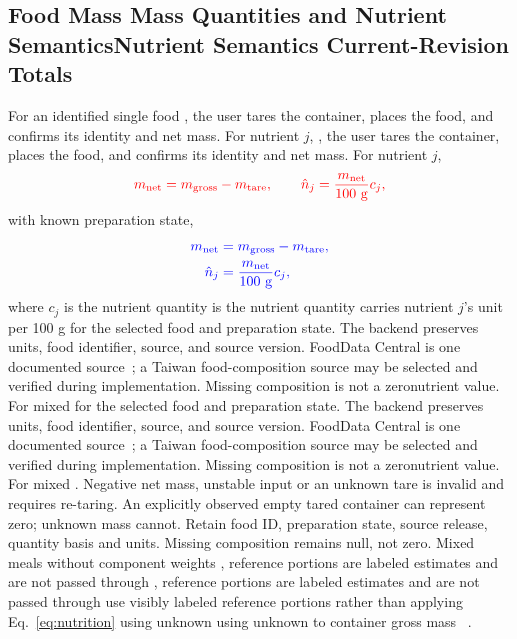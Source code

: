 \documentclass[conference]{IEEEtran}
\providecommand{\DIFadd}[1]{{\protect\color{blue} \sf #1}} %
\providecommand{\DIFdel}[1]{{\protect\color{red} \ifmmode #1\else\scriptsize #1\fi}} %
\providecommand{\DIFaddbegin}{} %
\providecommand{\DIFaddend}{} %
\providecommand{\DIFdelbegin}{} %
\providecommand{\DIFdelend}{} %
\begin{document}
\subsection{Food \DIFdelbegin \DIFdel{Mass }\DIFdelend \DIFaddbegin \DIFadd{Quantities }\DIFaddend and \DIFdelbegin \DIFdel{Nutrient Semantics}\DIFdelend \DIFaddbegin \DIFadd{Current-Revision Totals}\DIFaddend }
For an identified single food \DIFdelbegin \DIFdel{, the user tares the container, places the food, and confirms its identity and net mass. For nutrient $j$,
}\begin{displaymath}\DIFdel{m_{\rm net}=m_{\rm gross}-m_{\rm tare},\qquad
\hat n_j=\frac{m_{\rm net}}{100\ {\rm g}}c_j,%
}\end{displaymath}%
\DIFdelend \DIFaddbegin \DIFadd{with known preparation state,
}\begin{equation}\DIFadd{\begin{aligned}
m_{\rm net}&=m_{\rm gross}-m_{\rm tare},\\
\hat n_j&=\frac{m_{\rm net}}{100\ {\rm g}}c_j,
\end{aligned}\label{eq:nutrition}}\end{equation}\DIFaddend 
where $c_j$ \DIFdelbegin \DIFdel{is the nutrient quantity }\DIFdelend \DIFaddbegin \DIFadd{carries nutrient $j$'s unit }\DIFaddend per 100 g\DIFdelbegin \DIFdel{for the selected food and preparation state. The backend preserves units, food identifier, source, and source version. FoodData Central is one documented source~\cite{usda}; a Taiwan food-composition source may be selected and verified during implementation. Missing composition is not a zeronutrient value. For mixed }\DIFdelend \DIFaddbegin \DIFadd{. Negative net mass, unstable input or an unknown tare is invalid and requires re-taring. An explicitly observed empty tared container can represent zero; unknown mass cannot. Retain food ID, preparation state, source release, quantity basis and units. Missing composition remains null, not zero. Mixed }\DIFaddend meals without component weights \DIFdelbegin \DIFdel{, reference portions are labeled estimates and are not passed through }\DIFdelend \DIFaddbegin \DIFadd{use visibly labeled reference portions rather than applying }\DIFaddend Eq.~\eqref{eq:nutrition} \DIFdelbegin \DIFdel{using unknown }\DIFdelend \DIFaddbegin \DIFadd{to }\DIFaddend container gross mass\DIFaddbegin \DIFadd{~\cite{usda}}\DIFaddend .
\end{document}
